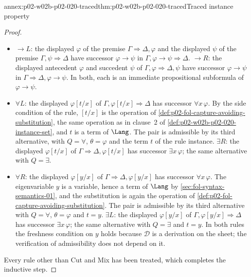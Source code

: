 \begin{annexitem}{annex:p02-w02b-p02-020-traced}{thm:p02-w02b-p02-020-traced}{Traced instance property}
\begin{proof}
\begin{itemize}
        \(\varphi\lor\psi\).  In both, each is an immediate propositional
        subformula of \(\varphi\lor\psi\).
  \item \(\to L\): the displayed \(\varphi\) of the premise
        \(\Gamma\Rightarrow\Delta,\varphi\) and the displayed \(\psi\) of the
        premise \(\Gamma,\psi\Rightarrow\Delta\) have successor
        \(\varphi\to\psi\) in \(\Gamma,\varphi\to\psi\Rightarrow\Delta\).
        \(\to R\): the displayed antecedent \(\varphi\) and succedent \(\psi\)
        of \(\Gamma,\varphi\Rightarrow\Delta,\psi\) have successor
        \(\varphi\to\psi\) in \(\Gamma\Rightarrow\Delta,\varphi\to\psi\).  In
        both, each is an immediate propositional subformula of
        \(\varphi\to\psi\).
  \item \(\forall L\): the displayed \(\varphi[t/x]\) of
        \(\Gamma,\varphi[t/x]\Rightarrow\Delta\) has successor
        \(\forall x\,\varphi\).  By the side condition of the rule,
        \([t/x]\) is the operation of
        \cref{def:p02-fol-capture-avoiding-substitution}, the same operation
        as in clause~2 of \cref{def:p02-w02b-p02-020-instance-set}, and \(t\)
        is a term of \(\Lang\).  The pair is admissible by its third
        alternative, with \(Q=\forall\), \(\theta=\varphi\) and the term
        \(t\) of the rule instance.  \(\exists R\): the displayed
        \(\varphi[t/x]\) of \(\Gamma\Rightarrow\Delta,\varphi[t/x]\) has
        successor \(\exists x\,\varphi\); the same alternative with
        \(Q=\exists\).
  \item \(\forall R\): the displayed \(\varphi[y/x]\) of
        \(\Gamma\Rightarrow\Delta,\varphi[y/x]\) has successor
        \(\forall x\,\varphi\).  The eigenvariable \(y\) is a variable, hence
        a term of \(\Lang\) by \cref{sec:fol-syntax-semantics-01}, and the substitution is
        again the operation of
        \cref{def:p02-fol-capture-avoiding-substitution}.  The pair is
        admissible by its third alternative with \(Q=\forall\),
        \(\theta=\varphi\) and \(t=y\).  \(\exists L\): the displayed
        \(\varphi[y/x]\) of \(\Gamma,\varphi[y/x]\Rightarrow\Delta\) has
        successor \(\exists x\,\varphi\); the same alternative with
        \(Q=\exists\) and \(t=y\).  In both rules the freshness condition on
        \(y\) holds because \(\mathcal D\) is a derivation on the sheet; the
        verification of admissibility does not depend on it.
\end{itemize}
Every rule other than Cut and Mix has been treated, which completes the
inductive step.


\end{proof}
\end{annexitem}
